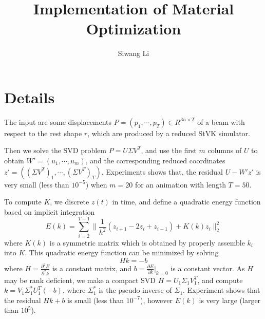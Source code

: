 \documentclass[twocolumn,a4paper]{article}
\author{Siwang Li}
\title{Implementation of Material Optimization}
\begin{document}
\maketitle

\section{Details}
The input are some displacements $P = (p_1,\cdots,p_T) \in R^{3n\times T}$ of a
beam with respect to the rest shape $r$, which are produced by a reduced StVK
simulator.

Then we solve the SVD problem $P = U\Sigma V^T$, and use the first $m$ columns
of $U$ to obtain $W' = (u_1,\cdots,u_m)$, and the corresponding reduced
coordinates $z' = ((\Sigma V^T)_1,\cdots,(\Sigma
V^T)_T)$. {\color{red}Experiments shows that, the residual $U-W'z'$ is very
  small (less than $10^{-5}$) when $m=20$ for an animation with length $T=50$.}

To compute $K$, we discrete $z(t)$ in time, and define a quadratic energy
function based on implicit integration
\begin{equation} \label{qua-en}
  E(k) = \sum_{i=2}^{T-1} \|\frac{1}{h^2}(z_{i+1}-2z_{i}+z_{i-1}) + K(k)z_i\|_2^2
\end{equation}
where $K(k)$ is a symmetric matrix which is obtained by properly assemble $k_i$
into $K$. This quadratic energy function can be minimized by solving
\begin{equation} \label{sol}
  Hk = -b
\end{equation}
where $H = \frac{\partial^2{E}}{\partial^2{k}}$ is a constant matrix, and $b =
\frac{\partial{E}}{\partial{k}}|_{k=0}$ is a constant vector. As $H$ may be rank
deficient, we make a compact SVD $H=U_1\Sigma_1 V^T_1$, and compute
$k=V_1\Sigma_1^{*}U_1^T(-b)$, where $\Sigma_1^{*}$ is the pseudo inverse of
$\Sigma_1$. {\color{red}Experiment shows that the residual $Hk+b$ is small (less than
$10^{-7}$), however $E(k)$ is very large (larger than $10^5$).}


\end{document}
